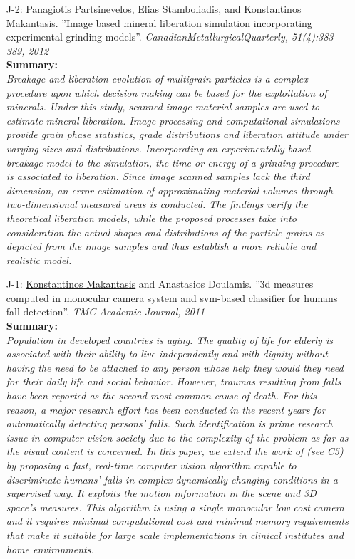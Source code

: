 \documentclass[a4paper,10pt]{article}
\begin{document}
\begin{itemize}
	\item [J-2:]Panagiotis Partsinevelos, Elias Stamboliadis, and \underline{Konstantinos Makantasis}. ''Image based mineral liberation simulation incorporating experimental grinding models''. \textit{CanadianMetallurgicalQuarterly, 51(4):383-389, 2012}\\
	\textbf{Summary:}\\
	\textit{Breakage and liberation evolution of multigrain particles is a complex procedure upon which decision making can be based for the exploitation of minerals. Under this study, scanned image material samples are used to estimate mineral liberation. Image processing and computational simulations provide grain phase statistics, grade distributions and liberation attitude under varying sizes and distributions. Incorporating an experimentally based breakage model to the simulation, the time or energy of a grinding procedure is associated to liberation. Since image scanned samples lack the third dimension, an error estimation of approximating material volumes through two-dimensional measured areas is conducted. The findings verify the theoretical liberation models, while the proposed processes take into consideration the actual shapes and distributions of the particle grains as depicted from the image samples and thus establish a more reliable and realistic model.}
	
	\item [J-1:]\underline{Konstantinos Makantasis} and Anastasios Doulamis. ''3d measures computed in monocular camera system and svm-based classifier for humans fall detection''. \textit{TMC Academic Journal, 2011}\\
	\textbf{Summary:}\\
	\textit{Population in developed countries is aging. The quality of life for elderly is associated with their ability to live independently and with dignity without having the need to be attached to any person whose help they would they need for their daily life and social behavior. However, traumas resulting from falls have been reported as the second most common cause of death. For this reason, a major research effort has been conducted in the recent years for automatically detecting persons’ falls. Such identification is prime research issue in computer vision society due to the complexity of the problem as far as the visual content is concerned. In this paper, we extend the work of (see C5) by proposing a fast, real-time computer vision algorithm capable to discriminate humans’ falls in complex dynamically changing conditions in a supervised way. It exploits the motion information in the scene and 3D space’s measures. This algorithm is using a single monocular low cost camera and it requires minimal computational cost and minimal memory requirements that make it suitable for large scale implementations in clinical institutes and home environments.}
\end{itemize}
\end{document}
